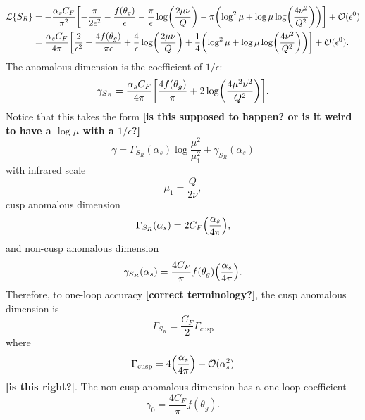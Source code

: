 \documentclass[11pt,twoside,reqno]{amsart}
\theoremstyle{plain}
\theoremstyle{remark}
\theoremstyle{definition}
\theoremstyle{remark}
\theoremstyle{definition}
\theoremstyle{definition}
\newcommand{\cL}{\mathcal{L}}
\newcommand{\cO}{\mathcal{O}}
\newcommand{\cusp}{\mathrm{cusp}}
\begin{document}
	\begin{equation}
	\begin{aligned}
		\cL\qty{S_R} &= -\frac{\alpha_s C_F}{\pi^2}\qty[-\frac{\pi}{2\epsilon^2} - \frac{f(\theta_g)}{\epsilon} - \frac{\pi}{\epsilon}\log(\frac{2\mu \nu}{Q}) - \pi\qty(\log^2\mu + \log\mu\log(\frac{4\nu^2}{Q^2}))] + \cO(\epsilon^0) \\
		&= \frac{\alpha_s C_F}{4\pi}\qty[\frac{2}{\epsilon^2} + \frac{4f(\theta_g)}{\pi\epsilon} + \frac{4}{\epsilon}\log(\frac{2\mu \nu}{Q}) + \frac{1}{4}\qty(\log^2\mu + \log\mu\log(\frac{4\nu^2}{Q^2}))] + \cO(\epsilon^0).
	\end{aligned}
	\end{equation}
	The anomalous dimension is the coefficient of $1/\epsilon$:
	\begin{equation}
		\gamma_{S_R} = \frac{\alpha_s C_F}{4\pi}\qty[\frac{4f(\theta_g)}{\pi} + 2\log(\frac{4\mu^2\nu^2}{Q^2})].
	\end{equation}
	Notice that this takes the form {\color{red}\textbf{[is this supposed to happen? or is it weird to have a $\log \mu$ with a $1/\epsilon$?]}}
	\begin{equation}
		\gamma = \Gamma_{S_R}(\alpha_s)\log\frac{\mu^2}{\mu_1^2} + \gamma_{S_R}(\alpha_s)
	\end{equation}
	with infrared scale
	\begin{equation}
		\mu_1 = \frac{Q}{2\nu},
	\end{equation}
	cusp anomalous dimension
	\begin{equation}\label{eq:soft cusp anomalous dimension}
		\Gamma_{S_R}(\alpha_s) = 2C_F \qty(\frac{\alpha_s}{4\pi}),
	\end{equation}
	and non-cusp anomalous dimension
	\begin{equation}
		\gamma_{S_R}(\alpha_s) = \frac{4C_F}{\pi}f(\theta_g)\qty(\frac{\alpha_s}{4\pi}).
	\end{equation}
	Therefore, to one-loop accuracy {\color{red}\textbf{[correct terminology?]}}, the cusp anomalous dimension is
	\begin{equation}
		\Gamma_{S_R} = \frac{C_F}{2} \Gamma_\cusp
	\end{equation}
	where \cite{frye_factorization_2016}
	\begin{equation}
		\Gamma_\cusp = 4\qty(\frac{\alpha_s}{4\pi}) + \cO(\alpha_s^2)
	\end{equation}
	{\color{red}\textbf{[is this right?]}}. The non-cusp anomalous dimension has a one-loop coefficient
	\begin{equation}\label{eq:non-cusp anomalous dimension}
		\boxed{\gamma_0 = \frac{4C_F}{\pi}f(\theta_g).}
	\end{equation}
\end{document}
